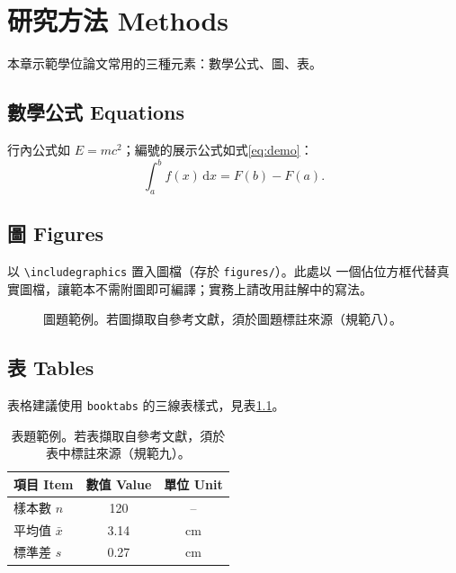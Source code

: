 \chapter{研究方法 Methods}
\label{ch:method}

本章示範學位論文常用的三種元素：數學公式、圖、表。

\section{數學公式 Equations}
行內公式如 $E = mc^2$；編號的展示公式如式\eqref{eq:demo}：
\begin{equation}
  \label{eq:demo}
  \int_{a}^{b} f(x)\,\mathrm{d}x = F(b) - F(a).
\end{equation}

\section{圖 Figures}
以 \texttt{\textbackslash includegraphics} 置入圖檔（存於 \texttt{figures/}）。此處以
一個佔位方框代替真實圖檔，讓範本不需附圖即可編譯；實務上請改用註解中的寫法。
\begin{figure}[htbp]
  \centering
  \caption{圖題範例。若圖擷取自參考文獻，須於圖題標註來源（規範八）。}
  \label{fig:demo}
\end{figure}

\section{表 Tables}
表格建議使用 \texttt{booktabs} 的三線表樣式，見表\ref{tab:demo}。
\begin{table}[htbp]
  \centering
  \caption{表題範例。若表擷取自參考文獻，須於表中標註來源（規範九）。}
  \label{tab:demo}
  \begin{tabular}{lcc}
    \toprule
    項目 Item & 數值 Value & 單位 Unit \\
    \midrule
    樣本數 $n$      & 120  & --   \\
    平均值 $\bar{x}$ & 3.14 & cm   \\
    標準差 $s$      & 0.27 & cm   \\
    \bottomrule
  \end{tabular}
\end{table}

